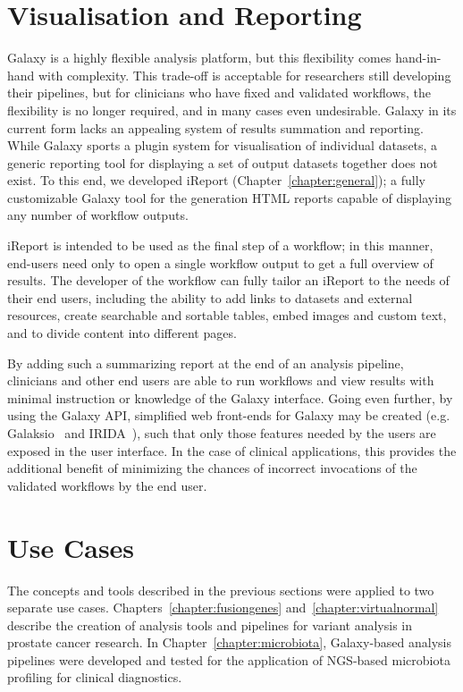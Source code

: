 \section{Visualisation and Reporting}
Galaxy is a highly flexible analysis platform, but this flexibility comes hand-in-hand with complexity. This trade-off is acceptable for researchers still developing their pipelines, but for clinicians who have fixed and validated workflows, the flexibility is no longer required, and in many cases even undesirable. Galaxy in its current form lacks an appealing system of results summation and reporting. While Galaxy sports a plugin system for visualisation of individual datasets, a generic reporting tool for displaying a set of output datasets together does not exist. To this end, we developed iReport (Chapter~\ref{chapter:general}); a fully customizable Galaxy tool for the generation HTML reports capable of displaying any number of workflow outputs.\

iReport is intended to be used as the final step of a workflow; in this manner, end-users need only to open a single workflow output to get a full overview of results. The developer of the workflow can fully tailor an iReport to the needs of their end users, including the ability to add links to datasets and external resources, create searchable and sortable tables, embed images and custom text, and to divide content into different pages.

By adding such a summarizing report at the end of an analysis pipeline, clinicians and other end users are able to run workflows and view results with minimal instruction or knowledge of the Galaxy interface. Going even further, by using the Galaxy API, simplified web front-ends for Galaxy may be created (e.g. Galaksio~\cite{klingstrom2017galaksio} and IRIDA~\cite{matthews2018integrated}), such that only those features needed by the users are exposed in the user interface. In the case of clinical applications, this provides the additional benefit of minimizing the chances of incorrect invocations of the validated workflows by the end user.

\section{Use Cases}

The concepts and tools described in the previous sections were applied to two separate use cases. Chapters~\ref{chapter:fusiongenes} and~\ref{chapter:virtualnormal} describe the creation of analysis tools and pipelines for variant analysis in prostate cancer research. In Chapter~\ref{chapter:microbiota}, Galaxy-based analysis pipelines were developed and tested for the application of NGS-based microbiota profiling for clinical diagnostics.


